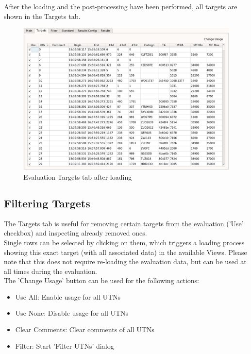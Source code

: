 After the loading and the post-processing have been performed, all targets are shown in the Targets tab.

\begin{figure}[H]
  \hspace*{-2cm}
    \includegraphics[width=18cm,frame]{figures/eval_targets_loaded.png}
  \caption{Evaluation Targets tab after loading}
\end{figure}

\subsection{Filtering Targets}
\label{sec:eval_filter_targets} 

The Targets tab is useful for removing certain targets from the evaluation ('Use' checkbox) and inspecting already removed ones. \\

Single rows can be selected by clicking on them, which triggers a loading process showing this exact target (with all associated data) in the available Views. Please note that this does not require re-loading the evaluation data, but can be used at all times during the evaluation. \\

The 'Change Usage' button can be used for the following actions:
\begin{itemize}  
\item Use All: Enable usage for all UTNs
\item Use None: Disable usage for all UTNs
\item Clear Comments: Clear comments of all UTNs
\item Filter: Start 'Filter UTNs' dialog
\end{itemize}
\ \\

